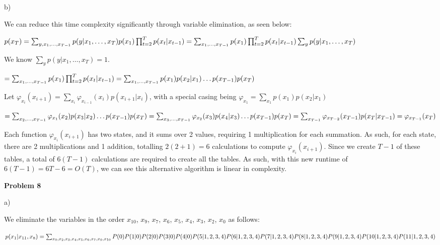 \documentclass[12pt]{article}
\begin{document}
b)

We can reduce this time complexity significantly through variable elimination, as seen below:

$p(x_T) \\
= \sum_{y, x_1, \dots, x_{T-1}} p(y \vert x_1, \dots, x_T)p(x_1)\prod_{t = 2}^{T} p(x_t \vert x_{t-1}) \\
= \sum_{x_1, \dots, x_{T-1}} p(x_1)\prod_{t = 2}^{T} p(x_t \vert x_{t-1}) \sum_y p(y \vert x_1, \dots, x_T)$

We know $\sum_y p(y \vert x_1, \dots, x_T) = 1$.

$= \sum_{x_1, \dots, x_{T-1}} p(x_1)\prod_{t = 2}^{T} p(x_t \vert x_{t-1}) \\
= \sum_{x_1, \dots, x_{T-1}} p(x_1)p(x_2 \vert x_1)\dots p(x_{T-1})p(x_T)$

Let $\varphi_{x_i}(x_{i+1}) = \sum_{x_i} \varphi_{x_{i-1}}(x_i)p(x_{i+1} \vert x_i)$, with a special casing being $\varphi_{x_1} = \sum_{x_1} p(x_1)p(x_{2} \vert x_1)$

$= \sum_{x_2, \dots, x_{T-1}} \varphi_{x_1}(x_2)p(x_3 \vert x_2)\dots p(x_{T-1})p(x_T) \\
= \sum_{x_3, \dots, x_{T-1}} \varphi_{x_2}(x_3)p(x_4 \vert x_3)\dots p(x_{T-1})p(x_T) \\
= \sum_{x_{T-1}} \varphi_{x_{T-2}}(x_{T-1})p(x_T \vert x_{T-1}) \\
= \varphi_{x_{T-1}}(x_{T})$

Each function $\varphi_{x_i}(x_{i+1})$ has two states, and it sums over 2 values, requiring 1 multiplication for each summation. As such, for each state, there are 2 multiplications and 1 addition, totalling $2(2 + 1) = 6$ calculations to compute $\varphi_{x_i}(x_{i+1})$. Since we create $T-1$ of these tables, a total of $6(T-1)$ calculations are required to create all the tables. As such, with this new runtime of $6(T-1) = 6T - 6 = O(T)$, we can see this alternative algorithm is linear in complexity.

\pagebreak\textbf{Problem 8}

a) 

We eliminate the variables in the order $x_{10}$, $x_{9}$, $x_{7}$, $x_{6}$, $x_{5}$, $x_{4}$, $x_{3}$, $x_{2}$, $x_0$ as follows:

$p(x_1 \vert x_{11}, x_8) \\
= \sum_{x_0, x_2, x_3, x_4, x_5, x_6, x_7, x_9, x_{10}} P(0)P(1 \vert 0)P(2 \vert 0)P(3 \vert 0)P(4 \vert 0)P(5 \vert 1, 2, 3, 4)\\P(6 \vert 1, 2, 3, 4)P(7 \vert 1, 2, 3, 4)P(8 \vert 1, 2, 3, 4)P(9 \vert 1, 2, 3, 4)P(10 \vert 1, 2, 3, 4)P(11 \vert 1, 2, 3, 4)$
\end{document}
